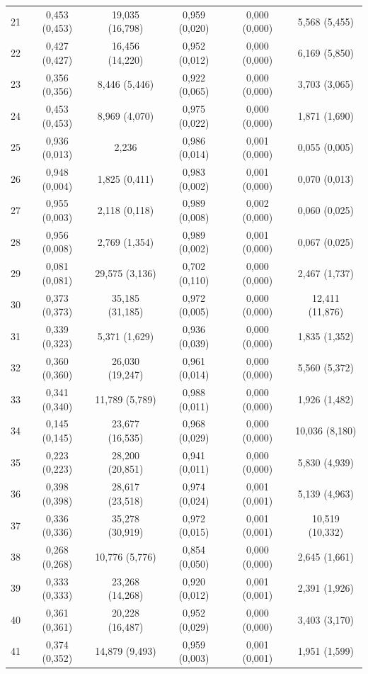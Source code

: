 \begin{tabular}{l c c c c c}
21 & 0,453 (0,453) & 19,035 (16,798) & 0,959 (0,020) & 0,000 (0,000) & 5,568 (5,455) \\
22 & 0,427 (0,427) & 16,456 (14,220) & 0,952 (0,012) & 0,000 (0,000) & 6,169 (5,850) \\
23 & 0,356 (0,356) & 8,446 (5,446) & 0,922 (0,065) & 0,000 (0,000) & 3,703 (3,065) \\
24 & 0,453 (0,453) & 8,969 (4,070) & 0,975 (0,022) & 0,000 (0,000) & 1,871 (1,690) \\
25 & 0,936 (0,013) & 2,236 & 0,986 (0,014) & 0,001 (0,000) & 0,055 (0,005) \\
26 & 0,948 (0,004) & 1,825 (0,411) & 0,983 (0,002) & 0,001 (0,000) & 0,070 (0,013) \\
27 & 0,955 (0,003) & 2,118 (0,118) & 0,989 (0,008) & 0,002 (0,000) & 0,060 (0,025) \\
28 & 0,956 (0,008) & 2,769 (1,354) & 0,989 (0,002) & 0,001 (0,000) & 0,067 (0,025) \\
29 & 0,081 (0,081) & 29,575 (3,136) & 0,702 (0,110) & 0,000 (0,000) & 2,467 (1,737) \\
30 & 0,373 (0,373) & 35,185 (31,185) & 0,972 (0,005) & 0,000 (0,000) & 12,411 (11,876) \\
31 & 0,339 (0,323) & 5,371 (1,629) & 0,936 (0,039) & 0,000 (0,000) & 1,835 (1,352) \\
32 & 0,360 (0,360) & 26,030 (19,247) & 0,961 (0,014) & 0,000 (0,000) & 5,560 (5,372) \\
33 & 0,341 (0,340) & 11,789 (5,789) & 0,988 (0,011) & 0,000 (0,000) & 1,926 (1,482) \\
34 & 0,145 (0,145) & 23,677 (16,535) & 0,968 (0,029) & 0,000 (0,000) & 10,036 (8,180) \\
35 & 0,223 (0,223) & 28,200 (20,851) & 0,941 (0,011) & 0,000 (0,000) & 5,830 (4,939) \\
36 & 0,398 (0,398) & 28,617 (23,518) & 0,974 (0,024) & 0,001 (0,001) & 5,139 (4,963) \\
37 & 0,336 (0,336) & 35,278 (30,919) & 0,972 (0,015) & 0,001 (0,001) & 10,519 (10,332) \\
38 & 0,268 (0,268) & 10,776 (5,776) & 0,854 (0,050) & 0,000 (0,000) & 2,645 (1,661) \\
39 & 0,333 (0,333) & 23,268 (14,268) & 0,920 (0,012) & 0,001 (0,001) & 2,391 (1,926) \\
40 & 0,361 (0,361) & 20,228 (16,487) & 0,952 (0,029) & 0,000 (0,000) & 3,403 (3,170) \\
41 & 0,374 (0,352) & 14,879 (9,493) & 0,959 (0,003) & 0,001 (0,001) & 1,951 (1,599) \\

\end{tabular}
